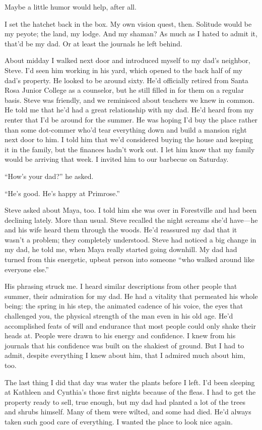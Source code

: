 \documentclass[12pt]{book}
\begin{document}
Maybe a little humor would help, after all.

I set the hatchet back in the box. My own vision quest, then. Solitude would be my peyote; the land, my lodge. And my shaman? As much as I hated to admit it, that'd be my dad. Or at least the journals he left behind.

About midday I walked next door and introduced myself to my dad's neighbor, Steve. I'd seen him working in his yard, which opened to the back half of my dad's property. He looked to be around sixty. He'd officially retired from Santa Rosa Junior College as a counselor, but he still filled in for them on a regular basis. Steve was friendly, and we reminisced about teachers we knew in common. He told me that he'd had a great relationship with my dad. He'd heard from my renter that I'd be around for the summer. He was hoping I'd buy the place rather than some dot-commer who'd tear everything down and build a mansion right next door to him. I told him that we'd considered buying the house and keeping it in the family, but the finances hadn't work out. I let him know that my family would be arriving that week. I invited him to our barbecue on Saturday.

``How's your dad?'' he asked.

``He's good. He's happy at Primrose.''

Steve asked about Maya, too. I told him she was over in Forestville and had been declining lately. More than usual. Steve recalled the night screams she'd have---he and his wife heard them through the woods. He'd reassured my dad that it wasn't a problem; they completely understood. Steve had noticed a big change in my dad, he told me, when Maya really started going downhill. My dad had turned from this energetic, upbeat person into someone ``who walked around like everyone else.''

His phrasing struck me. I heard similar descriptions from other people that summer, their admiration for my dad. He had a vitality that permeated his whole being: the spring in his step, the animated cadence of his voice, the eyes that challenged you, the physical strength of the man even in his old age. He'd accomplished feats of will and endurance that most people could only shake their heads at. People were drawn to his energy and confidence. I knew from his journals that his confidence was built on the shakiest of ground. But I had to admit, despite everything I knew about him, that I admired much about him, too.

The last thing I did that day was water the plants before I left. I'd been sleeping at Kathleen and Cynthia's those first nights because of the fleas. I had to get the property ready to sell, true enough, but my dad had planted a lot of the trees and shrubs himself. Many of them were wilted, and some had died. He'd always taken such good care of everything. I wanted the place to look nice again.
\end{document}
